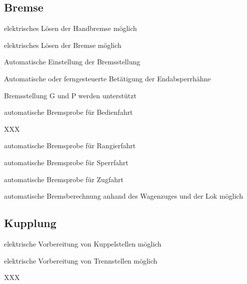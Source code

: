 \subsection{Bremse}
\begin{feat}[REQ. 9]
elektrisches Lösen der Handbremse möglich
\end{feat}
\begin{feat}[REQ. 10]
elektrisches Lösen der Bremse möglich
\end{feat}
\begin{feat}[REQ. 11]
Automatische Einstellung der Bremsstellung
\end{feat}
\begin{feat}[REQ. 12]
Automatische oder ferngesteuerte Betätigung der Endabsperrhähne
\end{feat}
\begin{feat}[REQ. 12]
Bremsstellung G und P werden unterstützt
\end{feat}
\begin{feat}[REQ. 13]
automatische Bremsprobe für Bedienfahrt
\end{feat}
\begin{rem}
XXX
\end{rem}
\begin{feat}
automatische Bremsprobe für Rangierfahrt
\end{feat}
\begin{feat}
automatische Bremsprobe für Sperrfahrt
\end{feat}
\begin{feat}
automatische Bremsprobe für Zugfahrt
\end{feat}
\begin{feat}
automatische Bremsberechnung anhand des Wagenzuges und der Lok möglich
\end{feat}

\subsection{Kupplung}
\begin{feat}[REQ. 14]
elektrische Vorbereitung von Kuppelstellen möglich
\end{feat}
\begin{feat}
elektrische Vorbereitung von Trennstellen möglich
\end{feat}
\begin{rem}
XXX
\end{rem}

